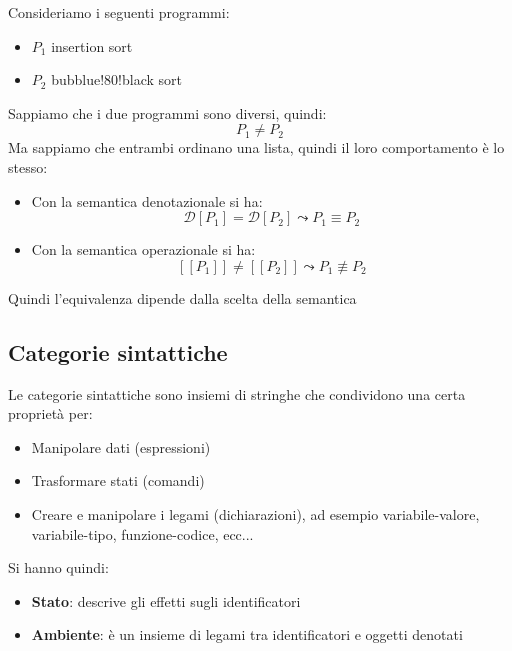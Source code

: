 \documentclass[a4paper]{article}
\begin{document}
\begin{Example}{}{}
  Consideriamo i seguenti programmi:
  \begin{itemize}
    \item \( P_1 \) insertion sort
    \item \( P_2 \) bubblue!80!black sort
  \end{itemize}
  Sappiamo che i due programmi sono diversi, quindi:
  \[
    P_1 \neq P_2
  \] 
  Ma sappiamo che entrambi ordinano una lista, quindi il loro comportamento è lo stesso:
  \begin{itemize}
    \item Con la semantica denotazionale si ha:
      \[
        \mathcal{D}[P_1] = \mathcal{D}[P_2] \leadsto P_1 \equiv P_2
      \] 

    \item Con la semantica operazionale si ha:
      \[
        [\![ P_1 ]\!] \neq [\![ P_2 ]\!] \leadsto P_1 \not\equiv P_2
      \] 
  \end{itemize}
  Quindi l'equivalenza dipende dalla scelta della semantica
\end{Example}

\subsection{Categorie sintattiche}
Le categorie sintattiche sono insiemi di stringhe che condividono una certa proprietà
per:
\begin{itemize}
  \item Manipolare dati (espressioni)
  \item Trasformare stati (comandi)
  \item Creare e manipolare i legami (dichiarazioni), ad esempio variabile-valore,
    variabile-tipo, funzione-codice, ecc...
\end{itemize}
Si hanno quindi:
\begin{itemize}
  \item \textbf{Stato}: descrive gli effetti sugli identificatori
  \item \textbf{Ambiente}: è un insieme di legami tra identificatori e oggetti
    denotati
\end{itemize}
\end{document}
